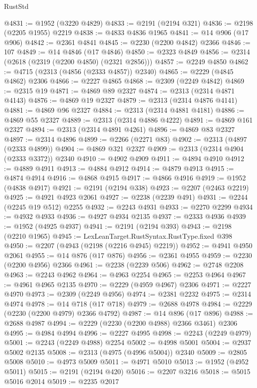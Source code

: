 \begin{lexlean}{RustStd}
\begin{coremodule}
@4831 := @1952 (@3220 @4829)
@4833 := @2191 (@2194 @321)
@4836 := @2198 (@2205 @1955) @2219
@4838 := @4833 @4836 @1965
@4841 := @14 @906 (@17 @906)
@4842 := @2361 @4841
@4845 := @2230 (@2200 @4842) @2366
@4846 := 107
@4849 := @14 @4846 (@17 @4846)
@4850 := @2323 @4849
@4856 := @2314 (@2618 (@2319 (@2200 @4850) (@2321 @2856)))
@4857 := @2249 @4850
@4862 := @4715 (@2313 (@4856 (@2333 @4857)) @2340)
@4865 := @2229 (@4845 @4862) @2306
@4866 := @2227 @4865
@4868 := @2309 (@2249 @4842)
@4869 := @2315 @19
@4871 := @4869 @89 @2327
@4874 := @2313 (@2314 @4871 @4143)
@4876 := @4869 @19 @2327
@4879 := @2313 (@2314 @4876 @4141)
@4881 := @4869 @96 @2327
@4884 := @2313 (@2314 @4881 @4181)
@4886 := @4869 @55 @2327
@4889 := @2313 (@2314 @4886 @4222)
@4891 := @4869 @161 @2327
@4894 := @2313 (@2314 @4891 @4261)
@4896 := @4869 @83 @2327
@4897 := @2314 @4896
@4899 := @2266 (@2271 @83)
@4902 := @2313 (@4897 (@2333 @4899))
@4904 := @4869 @321 @2327
@4909 := @2313 (@2314 @4904 (@2333 @3372)) @2340
@4910 := @4902 @4909
@4911 := @4894 @4910
@4912 := @4889 @4911
@4913 := @4884 @4912
@4914 := @4879 @4913
@4915 := @4874 @4914
@4916 := @4868 @4915
@4917 := @4866 @4916
@4919 := @1952 (@4838 @4917)
@4921 := @2191 (@2194 @338)
@4923 := @2207 (@2463 @2219)
@4925 := @4921 @4923 @2061
@4927 := @2238 (@2239 @491)
@4931 := @2244 (@2245 @19 @512) @2255
@4932 := @2243 @4931
@4933 := @2270 @2299
@4934 := @4932 @4933
@4936 := @4927 @4934 @2135
@4937 := @2333 @4936
@4939 := @1952 (@4925 @4937)
@4941 := @2191 (@2194 @393)
@4943 := @2198 (@2210 @1965)
@4945 := LexLeanTarget.RustSyntax.RustType.fixed @398
@4950 := @2207 (@4943 (@2198 (@2216 @4945) @2219))
@4952 := @4941 @4950 @2061
@4955 := @14 @876 (@17 @876)
@4956 := @2361 @4955
@4959 := @2230 (@2200 @4956) @2366
@4961 := @2238 (@2239 @506)
@4962 := @2748 @2208
@4963 := @2243 @4962
@4964 := @4963 @2254
@4965 := @2253 @4964
@4967 := @4961 @4965 @2135
@4970 := @2229 (@4959 @4967) @2306
@4971 := @2227 @4970
@4973 := @2309 (@2249 @4956)
@4974 := @2381 @2232
@4975 := @2314 @4974
@4978 := @14 @718 (@17 @718)
@4979 := @2688 @4978
@4984 := @2229 (@2230 (@2200 @4979) @2366 @4792)
@4987 := @14 @896 (@17 @896)
@4988 := @2688 @4987
@4994 := @2229 (@2230 (@2200 @4988) @2366 @3461) @2306
@4995 := @4984 @4994
@4996 := @2227 @4995
@4998 := @2243 (@2249 @4979)
@5001 := @2243 (@2249 @4988) @2254
@5002 := @4998 @5001
@5004 := @2937 @5002 @2135
@5008 := @2313 (@4975 (@4996 @5004)) @2340
@5009 := @2805 @5008
@5010 := @4973 @5009
@5011 := @4971 @5010
@5013 := @1952 (@4952 @5011)
@5015 := @2191 (@2194 @420)
@5016 := @2207 @3216
@5018 := @5015 @5016 @2014
@5019 := @2235 @2017

\end{coremodule}
\end{lexlean}
